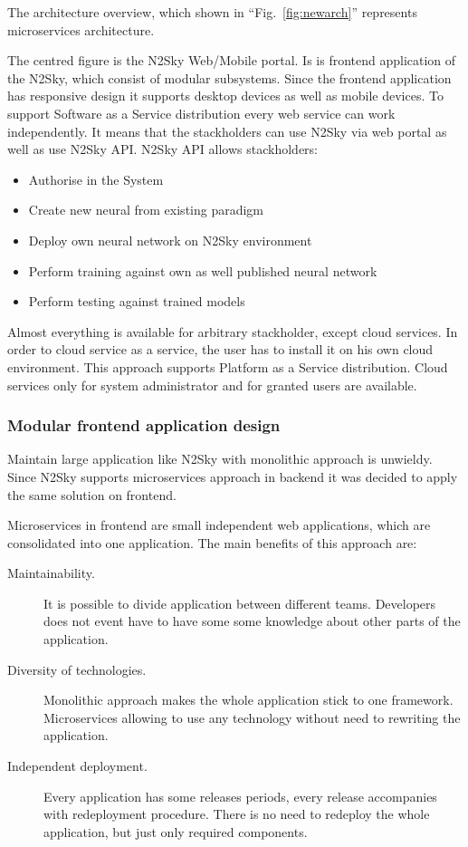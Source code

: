 The architecture overview, which shown in ``Fig.~\ref{fig:newarch}'' represents microservices architecture. 

The centred figure is the N2Sky Web/Mobile portal. Is is frontend application of the N2Sky, which consist of modular subsystems. Since the frontend application has responsive design it supports desktop devices as well as mobile devices. 
To support Software as a Service distribution every web service can work independently. It means that the stackholders can use N2Sky via web portal as well as use N2Sky API.
N2Sky API allows  stackholders:

\begin{itemize}
\item Authorise in the System
\item Create new neural from existing paradigm
\item Deploy own neural network on N2Sky environment 
\item Perform training against own as well published neural network
\item Perform testing against trained models
\end{itemize}

Almost everything is available for arbitrary stackholder, except cloud services. In order to cloud service as a service, the user has to install it on his own cloud environment. This approach supports Platform as a Service distribution. Cloud services only for system administrator and for granted users are available. 


 
 
\subsubsection{Modular frontend application design}\label{Modular frontend application design}
Maintain large application like N2Sky with monolithic approach is unwieldy. Since N2Sky supports microservices approach in backend it was decided to apply the same solution on frontend.  

Microservices in frontend are small independent web applications, which are consolidated into one application. The main benefits of this approach are:
\begin{description}
\item[Maintainability.] It is possible to divide application between different teams. Developers does not event have to have some some knowledge about other parts of the application. 
\item[Diversity of technologies.] Monolithic approach makes the whole application stick to one framework. Microservices allowing to use any technology without need to rewriting the application.
\item[Independent deployment.] Every application has some releases periods, every release accompanies with redeployment procedure. There is no need to redeploy the whole application, but just only required components.
\end{description}

